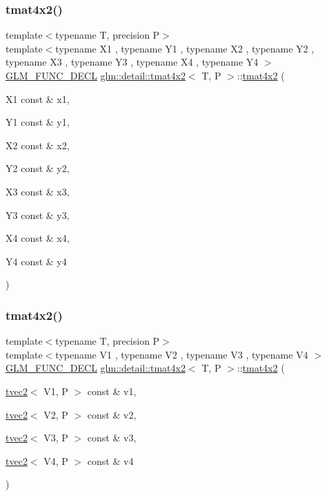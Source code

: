 \subsubsection{\texorpdfstring{tmat4x2()}{tmat4x2()}\hspace{0.1cm}{\footnotesize\ttfamily [8/22]}}
{\footnotesize\ttfamily template$<$typename T, precision P$>$ \\
template$<$typename X1 , typename Y1 , typename X2 , typename Y2 , typename X3 , typename Y3 , typename X4 , typename Y4 $>$ \\
\hyperlink{setup_8hpp_ab2d052de21a70539923e9bcbf6e83a51}{G\+L\+M\+\_\+\+F\+U\+N\+C\+\_\+\+D\+E\+CL} \hyperlink{structglm_1_1detail_1_1tmat4x2}{glm\+::detail\+::tmat4x2}$<$ T, P $>$\+::\hyperlink{structglm_1_1detail_1_1tmat4x2}{tmat4x2} (\begin{DoxyParamCaption}\item[{X1 const \&}]{x1,  }\item[{Y1 const \&}]{y1,  }\item[{X2 const \&}]{x2,  }\item[{Y2 const \&}]{y2,  }\item[{X3 const \&}]{x3,  }\item[{Y3 const \&}]{y3,  }\item[{X4 const \&}]{x4,  }\item[{Y4 const \&}]{y4 }\end{DoxyParamCaption})}

\mbox{\label{structglm_1_1detail_1_1tmat4x2_abbb030181da4728bc6d618aa24aa17a8}} 
\subsubsection{\texorpdfstring{tmat4x2()}{tmat4x2()}\hspace{0.1cm}{\footnotesize\ttfamily [9/22]}}
{\footnotesize\ttfamily template$<$typename T, precision P$>$ \\
template$<$typename V1 , typename V2 , typename V3 , typename V4 $>$ \\
\hyperlink{setup_8hpp_ab2d052de21a70539923e9bcbf6e83a51}{G\+L\+M\+\_\+\+F\+U\+N\+C\+\_\+\+D\+E\+CL} \hyperlink{structglm_1_1detail_1_1tmat4x2}{glm\+::detail\+::tmat4x2}$<$ T, P $>$\+::\hyperlink{structglm_1_1detail_1_1tmat4x2}{tmat4x2} (\begin{DoxyParamCaption}\item[{\hyperlink{structglm_1_1detail_1_1tvec2}{tvec2}$<$ V1, P $>$ const \&}]{v1,  }\item[{\hyperlink{structglm_1_1detail_1_1tvec2}{tvec2}$<$ V2, P $>$ const \&}]{v2,  }\item[{\hyperlink{structglm_1_1detail_1_1tvec2}{tvec2}$<$ V3, P $>$ const \&}]{v3,  }\item[{\hyperlink{structglm_1_1detail_1_1tvec2}{tvec2}$<$ V4, P $>$ const \&}]{v4 }\end{DoxyParamCaption})}

